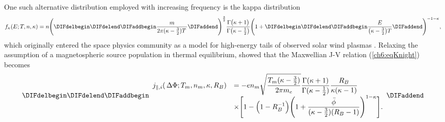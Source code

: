   One such alternative distribution employed with increasing frequency is the
  kappa distribution \citep{Livadiotis2013}
    \begin{equation} \label{ch6:eqKappa1D} f_{\kappa}(E; T, n, \kappa) = n \Bigg
      ( \DIFdelbegin %
\DIFdelend \DIFaddbegin \dfrac{m}{2 \pi (\kappa - \frac{3}{2}) T \, } \DIFaddend \Bigg
      )^{\frac{3}{2}} \dfrac{\Gamma \big ( \kappa + 1 \big ) }{\Gamma \big (
        \kappa - \frac{1}{2} \big ) } \Bigg ( 1 + \DIFdelbegin %
\DIFdelend \DIFaddbegin \dfrac{E}{ \big ( \kappa -
        \frac{3}{2} \big ) T } \DIFaddend \Bigg )^{-1 - \kappa},
    \end{equation}
   which originally entered the space physics community as a model for
   high-energy tails of observed solar wind plasmas
   \citep{Vasyliunas1968}. Relaxing the assumption of a magnetospheric source
   population in thermal equilibrium, \citet{Dors1999} showed that the
   Maxwellian J-V relation (\ref{ch6:eqKnight}) becomes
    \begin{align}
      \label{ch6:eqDors}
      \DIFdelbegin %
\DIFdelend \DIFaddbegin \begin{array}{ll}
        j_{\parallel,i} ( \, \Delta \Phi ; T_m, n_m, \kappa, R_B ) &= - e n_m \sqrt{ \dfrac{ T_m (\kappa -
            \frac{3}{2})}{ 2 \pi m_e}} \dfrac{\Gamma (\kappa + 1)}{\Gamma (\kappa - \frac{1}{2})} \dfrac{R_B}{\kappa (\kappa - 1)} \\
        &\times \Bigg[1 - \Big(1 - R_B^{-1} \Big) \Bigg(1+\dfrac{\bar{\phi}}{ (\kappa - \frac{3}{2})(R_B - 1)} \Bigg)^{1-\kappa} \Bigg].
      \end{array}
    \DIFaddend \end{align}
